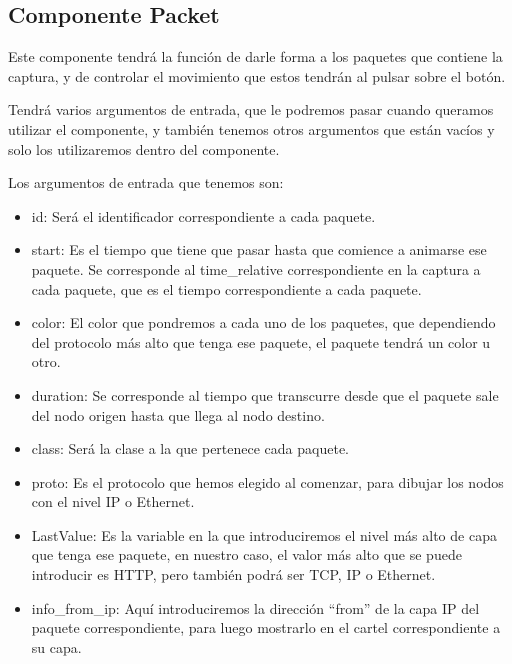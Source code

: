 \documentclass[a4paper, 12pt]{book}
\begin{document}
\subsection{Componente Packet}

Este componente tendrá la función de darle forma a los paquetes que contiene la captura, y de controlar el movimiento que estos tendrán al pulsar sobre el botón.

Tendrá varios argumentos de entrada, que le podremos pasar cuando queramos utilizar el componente, y también tenemos otros argumentos que están vacíos y solo los utilizaremos dentro del componente.

Los argumentos de entrada que tenemos son:
\begin{itemize}
    \item id: Será el identificador correspondiente a cada paquete.
    
    \item start: Es el tiempo que tiene que pasar hasta que comience a animarse ese paquete. Se corresponde al time\_relative correspondiente en la captura a cada paquete, que es el tiempo correspondiente a cada paquete.
    
    \item color: El color que pondremos a cada uno de los paquetes, que dependiendo del protocolo más alto que tenga ese paquete, el paquete tendrá un color u otro.
    
    \item duration: Se corresponde al tiempo que transcurre desde que el paquete sale del nodo origen hasta que llega al nodo destino.
    
    \item class: Será la clase a la que pertenece cada paquete.
    
    \item proto: Es el protocolo que hemos elegido al comenzar, para dibujar los nodos con el nivel IP o Ethernet.

    \item LastValue: Es la variable en la que introduciremos el nivel más alto de capa que tenga ese paquete, en nuestro caso, el valor más alto que se puede introducir es HTTP, pero también podrá ser TCP, IP o Ethernet.

    \item info\_from\_ip: Aquí introduciremos la dirección “from” de la capa IP del paquete correspondiente, para luego mostrarlo en el cartel correspondiente a su capa.
    

\end{itemize}
\end{document}
